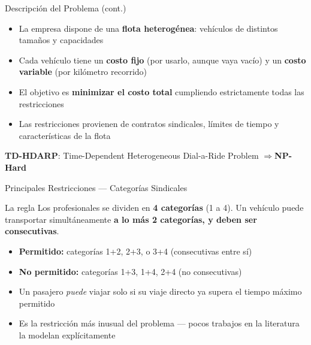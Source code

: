 \documentclass[10pt, aspectratio=169]{beamer}
\begin{document}
\begin{frame}{Descripción del Problema \textnormal{\small (cont.)}}

  \begin{itemize}\setlength\itemsep{12pt}
    \item La empresa dispone de una \textbf{flota heterogénea}: vehículos de distintos tamaños y capacidades
    \item Cada vehículo tiene un \textbf{costo fijo} (por usarlo, aunque vaya vacío) y un \textbf{costo variable} (por kilómetro recorrido)
    \item El objetivo es \textbf{minimizar el costo total} cumpliendo estrictamente todas las restricciones
    \item Las restricciones provienen de contratos sindicales, límites de tiempo y características de la flota
  \end{itemize}

  \vspace{14pt}
  \begin{block}{}
    \centering\textbf{TD-HDARP}: Time-Dependent Heterogeneous Dial-a-Ride Problem \quad$\Rightarrow$\quad \textbf{NP-Hard}
  \end{block}

\end{frame}

\begin{frame}{Principales Restricciones — Categorías Sindicales}

  \begin{block}{La regla}
    Los profesionales se dividen en \textbf{4 categorías} (1 a 4). Un vehículo puede transportar simultáneamente \textbf{a lo más 2 categorías, y deben ser consecutivas}.
  \end{block}

  \vspace{10pt}
  \begin{itemize}\setlength\itemsep{10pt}
    \item \textcolor{verdeok}{\textbf{Permitido:}} categorías 1+2, 2+3, o 3+4 (consecutivas entre sí)
    \item \textcolor{rojono}{\textbf{No permitido:}} categorías 1+3, 1+4, 2+4 (no consecutivas)
    \item Un pasajero \textit{puede} viajar solo si su viaje directo ya supera el tiempo máximo permitido
    \item Es la restricción más inusual del problema — pocos trabajos en la literatura la modelan explícitamente
  \end{itemize}

\end{frame}
\end{document}
